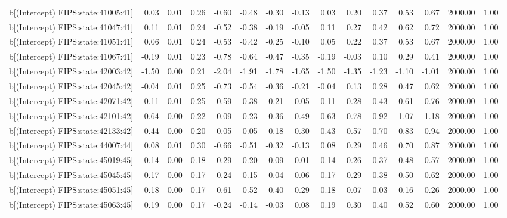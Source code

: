 \begin{table}[ht]
\begin{tabular}{rrrrrrrrrrrrrrr}
  b[(Intercept) FIPS:state:41005:41] & 0.03 & 0.01 & 0.26 & -0.60 & -0.48 & -0.30 & -0.13 & 0.03 & 0.20 & 0.37 & 0.53 & 0.67 & 2000.00 & 1.00 \\ 
  b[(Intercept) FIPS:state:41047:41] & 0.11 & 0.01 & 0.24 & -0.52 & -0.38 & -0.19 & -0.05 & 0.11 & 0.27 & 0.42 & 0.62 & 0.72 & 2000.00 & 1.00 \\ 
  b[(Intercept) FIPS:state:41051:41] & 0.06 & 0.01 & 0.24 & -0.53 & -0.42 & -0.25 & -0.10 & 0.05 & 0.22 & 0.37 & 0.53 & 0.67 & 2000.00 & 1.00 \\ 
  b[(Intercept) FIPS:state:41067:41] & -0.19 & 0.01 & 0.23 & -0.78 & -0.64 & -0.47 & -0.35 & -0.19 & -0.03 & 0.10 & 0.29 & 0.41 & 2000.00 & 1.00 \\ 
  b[(Intercept) FIPS:state:42003:42] & -1.50 & 0.00 & 0.21 & -2.04 & -1.91 & -1.78 & -1.65 & -1.50 & -1.35 & -1.23 & -1.10 & -1.01 & 2000.00 & 1.00 \\ 
  b[(Intercept) FIPS:state:42045:42] & -0.04 & 0.01 & 0.25 & -0.73 & -0.54 & -0.36 & -0.21 & -0.04 & 0.13 & 0.28 & 0.47 & 0.62 & 2000.00 & 1.00 \\ 
  b[(Intercept) FIPS:state:42071:42] & 0.11 & 0.01 & 0.25 & -0.59 & -0.38 & -0.21 & -0.05 & 0.11 & 0.28 & 0.43 & 0.61 & 0.76 & 2000.00 & 1.00 \\ 
  b[(Intercept) FIPS:state:42101:42] & 0.64 & 0.00 & 0.22 & 0.09 & 0.23 & 0.36 & 0.49 & 0.63 & 0.78 & 0.92 & 1.07 & 1.18 & 2000.00 & 1.00 \\ 
  b[(Intercept) FIPS:state:42133:42] & 0.44 & 0.00 & 0.20 & -0.05 & 0.05 & 0.18 & 0.30 & 0.43 & 0.57 & 0.70 & 0.83 & 0.94 & 2000.00 & 1.00 \\ 
  b[(Intercept) FIPS:state:44007:44] & 0.08 & 0.01 & 0.30 & -0.66 & -0.51 & -0.32 & -0.13 & 0.08 & 0.29 & 0.46 & 0.70 & 0.87 & 2000.00 & 1.00 \\ 
  b[(Intercept) FIPS:state:45019:45] & 0.14 & 0.00 & 0.18 & -0.29 & -0.20 & -0.09 & 0.01 & 0.14 & 0.26 & 0.37 & 0.48 & 0.57 & 2000.00 & 1.00 \\ 
  b[(Intercept) FIPS:state:45045:45] & 0.17 & 0.00 & 0.17 & -0.24 & -0.15 & -0.04 & 0.06 & 0.17 & 0.29 & 0.38 & 0.50 & 0.62 & 2000.00 & 1.00 \\ 
  b[(Intercept) FIPS:state:45051:45] & -0.18 & 0.00 & 0.17 & -0.61 & -0.52 & -0.40 & -0.29 & -0.18 & -0.07 & 0.03 & 0.16 & 0.26 & 2000.00 & 1.00 \\ 
  b[(Intercept) FIPS:state:45063:45] & 0.19 & 0.00 & 0.17 & -0.24 & -0.14 & -0.03 & 0.08 & 0.19 & 0.30 & 0.40 & 0.52 & 0.60 & 2000.00 & 1.00 \\ 

\end{tabular}
\end{table}
